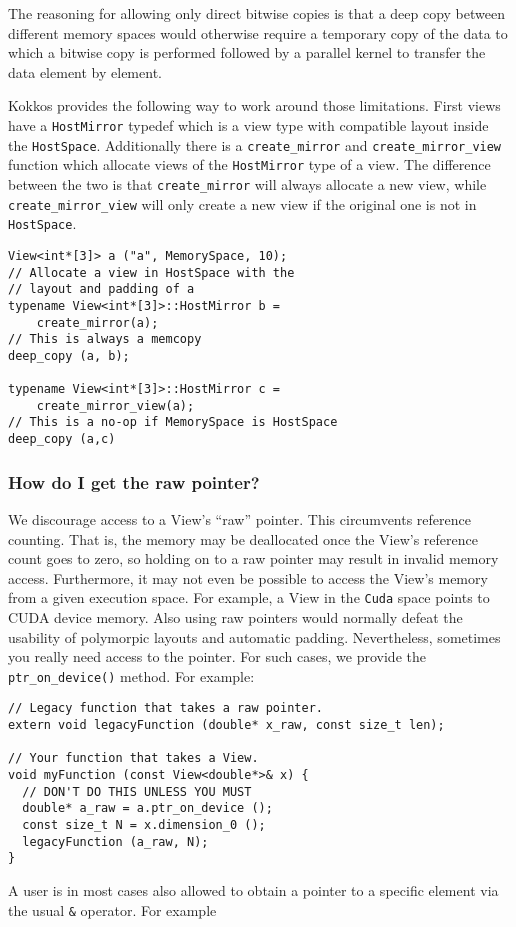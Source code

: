 The reasoning for allowing only direct bitwise copies is that a deep copy
between different memory spaces would otherwise require a temporary 
copy of the data to which a bitwise copy is performed followed by a parallel
kernel to transfer the data element by element. 

Kokkos provides the following way to work around those limitations. 
First views have a \lstinline|HostMirror| typedef which is a view type with 
compatible layout inside the \lstinline|HostSpace|. Additionally there is a
\lstinline|create_mirror| and \lstinline|create_mirror_view| function which 
allocate views of the \lstinline|HostMirror| type of a view. 
The difference between the two is that \lstinline|create_mirror| will always
allocate a new view, while \lstinline|create_mirror_view| will only create a 
new view if the original one is not in \lstinline|HostSpace|.

\begin{lstlisting}
View<int*[3]> a ("a", MemorySpace, 10);
// Allocate a view in HostSpace with the 
// layout and padding of a
typename View<int*[3]>::HostMirror b =
    create_mirror(a);
// This is always a memcopy
deep_copy (a, b); 

typename View<int*[3]>::HostMirror c =
    create_mirror_view(a);
// This is a no-op if MemorySpace is HostSpace
deep_copy (a,c)
\end{lstlisting}


\subsubsection{How do I get the raw pointer?}

We discourage access to a View's ``raw'' pointer.  This circumvents
reference counting.  That is, the memory may be deallocated once the
View's reference count goes to zero, so holding on to a raw pointer
may result in invalid memory access.  Furthermore, it may not even be
possible to access the View's memory from a given execution space.
For example, a View in the \lstinline!Cuda! space points to CUDA device
memory. Also using raw pointers would normally defeat the usability 
of polymorpic layouts and automatic padding. 
Nevertheless, sometimes you really need access to the
pointer.  For such cases, we provide the \lstinline!ptr_on_device()!
method.  For example:
\begin{lstlisting}
// Legacy function that takes a raw pointer.
extern void legacyFunction (double* x_raw, const size_t len);

// Your function that takes a View.
void myFunction (const View<double*>& x) {
  // DON'T DO THIS UNLESS YOU MUST
  double* a_raw = a.ptr_on_device ();
  const size_t N = x.dimension_0 ();
  legacyFunction (a_raw, N);
}
\end{lstlisting}
A user is in most cases also allowed to obtain a pointer to a specific 
element via the usual \lstinline|&| operator. For example

